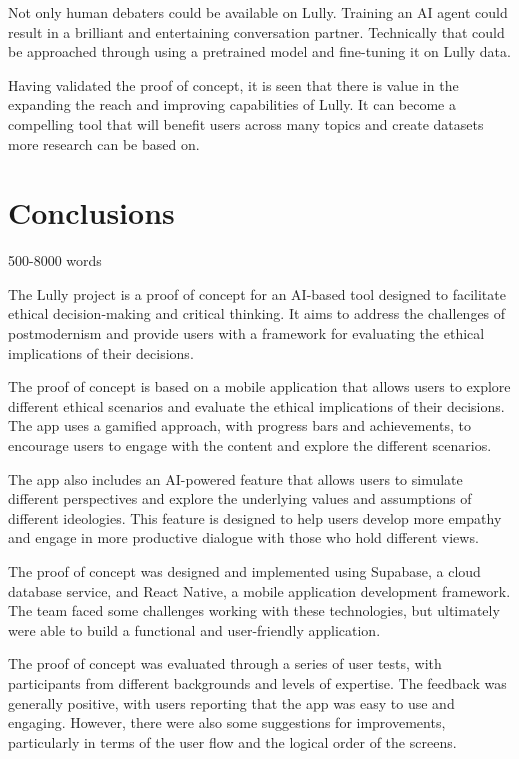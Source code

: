 \documentclass{article}
\begin{document}
Not only human debaters could be available on Lully. Training an AI agent could result in a brilliant and entertaining conversation partner. Technically that could be approached through using a pretrained model and fine-tuning it on Lully data.

Having validated the proof of concept, it is seen that there is value in the expanding the reach and improving capabilities of Lully. It can become a compelling tool that will benefit users across many topics and create datasets more research can be based on.

\newpage

\section{Conclusions} 500-8000 words

The Lully project is a proof of concept for an AI-based tool designed to facilitate ethical decision-making and critical thinking. It aims to address the challenges of postmodernism and provide users with a framework for evaluating the ethical implications of their decisions.

The proof of concept is based on a mobile application that allows users to explore different ethical scenarios and evaluate the ethical implications of their decisions. The app uses a gamified approach, with progress bars and achievements, to encourage users to engage with the content and explore the different scenarios.

The app also includes an AI-powered feature that allows users to simulate different perspectives and explore the underlying values and assumptions of different ideologies. This feature is designed to help users develop more empathy and engage in more productive dialogue with those who hold different views.

The proof of concept was designed and implemented using Supabase, a cloud database service, and React Native, a mobile application development framework. The team faced some challenges working with these technologies, but ultimately were able to build a functional and user-friendly application.

The proof of concept was evaluated through a series of user tests, with participants from different backgrounds and levels of expertise. The feedback was generally positive, with users reporting that the app was easy to use and engaging. However, there were also some suggestions for improvements, particularly in terms of the user flow and the logical order of the screens.
\end{document}
